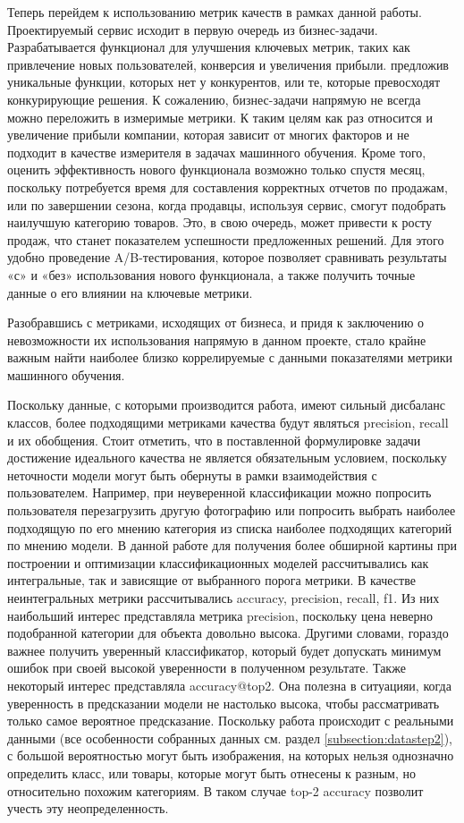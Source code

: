 \documentclass[a4paper,12pt]{extarticle}
\begin{document}
Теперь перейдем к использованию метрик качеств в рамках данной работы. Проектируемый сервис исходит в первую очередь из бизнес-задачи. Разрабатывается функционал для улучшения ключевых метрик, таких как привлечение новых пользователей, конверсия и увеличения прибыли. предложив уникальные функции, которых нет у конкурентов, или те, которые превосходят конкурирующие решения. К сожалению, бизнес-задачи напрямую не всегда можно переложить в измеримые метрики. К таким целям как раз относится и увеличение прибыли компании, которая зависит от многих факторов и не подходит в качестве измерителя в задачах машинного обучения. Кроме того, оценить эффективность нового функционала возможно только спустя месяц, поскольку потребуется время для составления корректных отчетов по продажам, или по завершении сезона, когда продавцы, используя сервис, смогут подобрать наилучшую категорию товаров. Это, в свою очередь, может привести к росту продаж, что станет показателем успешности предложенных решений. Для этого удобно проведение A/B-тестирования, которое позволяет сравнивать результаты «с» и «без» использования нового функционала, а также получить точные данные о его влиянии на ключевые метрики.

Разобравшись с метриками, исходящих от бизнеса, и придя к заключению о невозможности их использования напрямую в данном проекте, стало крайне важным найти наиболее близко коррелируемые с данными показателями метрики машинного обучения. 

Поскольку данные, с которыми производится работа, имеют сильный дисбаланс классов, более подходящими метриками качества будут являться precision, recall и их обобщения. Стоит отметить, что в поставленной формулировке задачи достижение идеального качества не является обязательным условием, поскольку неточности модели могут быть обернуты в рамки взаимодействия с пользователем. Например, при неуверенной классификации можно попросить пользователя перезагрузить другую фотографию или попросить выбрать наиболее подходящую по его мнению категория из списка наиболее подходящих категорий по мнению модели. В данной работе для получения более обширной картины при построении и оптимизации классификационных моделей рассчитывались как интегральные, так и зависящие от выбранного порога метрики. В качестве неинтегральных метрики рассчитывались accuracy, precision, recall, f1. Из них наибольший интерес представляла метрика precision, поскольку цена неверно подобранной категории для объекта довольно высока. Другими словами, гораздо важнее получить уверенный классификатор, который будет допускать минимум ошибок при своей высокой уверенности в полученном результате. Также некоторый интерес представляла accuracy@top2. Она полезна в ситуацияи, когда уверенность в предсказании модели не настолько высока, чтобы рассматривать только самое вероятное предсказание. Поскольку работа происходит с реальными данными (все особенности собранных данных см. раздел \ref{subsection:datastep2}), с большой вероятностью могут быть изображения, на которых нельзя однозначно определить класс, или товары, которые могут быть отнесены к разным, но относительно похожим категориям. В таком случае top-2 accuracy позволит учесть эту неопределенность.
\end{document}
